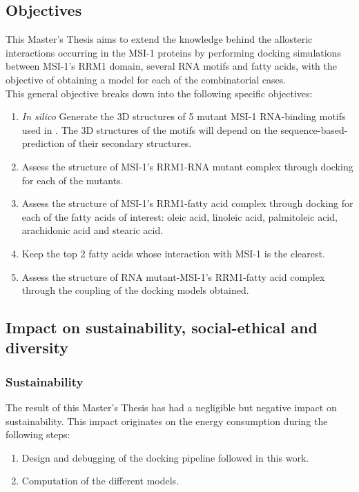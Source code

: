 \subsection{Objectives}

This Master's Thesis aims to extend the knowledge behind the allosteric interactions occurring in the MSI-1 proteins by performing docking simulations between MSI-1's RRM1 domain, several RNA motifs and fatty acids, with the objective of obtaining a model for each of the combinatorial cases.\\

This general objective breaks down into the following specific objectives:

\begin{enumerate}
    \item \textit{In silico} Generate the 3D structures of 5 mutant MSI-1 RNA-binding motifs used in \cite{dolcemascolo_2022}. The 3D structures of the motifs will depend on the sequence-based-prediction of their secondary structures.
    \item Assess the structure of MSI-1's RRM1-RNA mutant complex through docking for each of the mutants.
    \item Assess the structure of MSI-1's RRM1-fatty acid complex through docking for each of the fatty acids of interest: oleic acid, linoleic acid, palmitoleic acid, arachidonic acid and stearic acid.
    \item Keep the top 2 fatty acids whose interaction with MSI-1 is the clearest.
    \item Assess the structure of RNA mutant-MSI-1's RRM1-fatty acid complex through the coupling of the docking models obtained.
\end{enumerate}
    
\subsection{Impact on sustainability, social-ethical and diversity}

\subsubsection{Sustainability}

The result of this Master's Thesis has had a negligible but negative impact on sustainability. This impact originates on the energy consumption during the following steps:

\begin{enumerate}
    \item Design and debugging of the docking pipeline followed in this work.
    \item Computation of the different models.
\end{enumerate}

